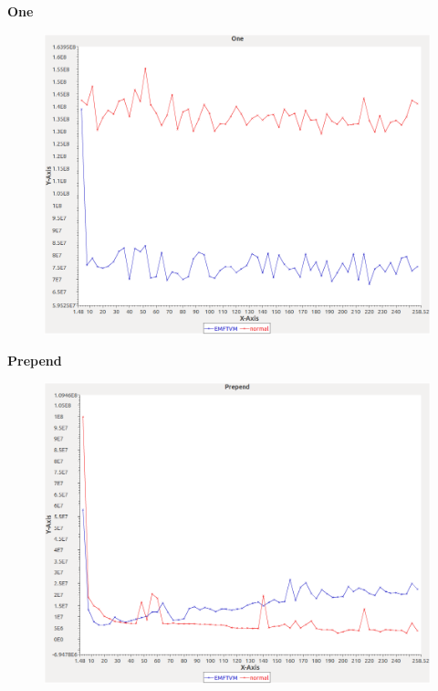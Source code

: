 \noindent\textbf{One}

\begin{figure}[h]
\centering
\includegraphics[width=\textwidth]{graphs/sequence/One}
\end{figure}
\pagebreak

\noindent\textbf{Prepend}

\begin{figure}[h]
\centering
\includegraphics[width=\textwidth]{graphs/sequence/Prepend}
\end{figure}
\pagebreak

